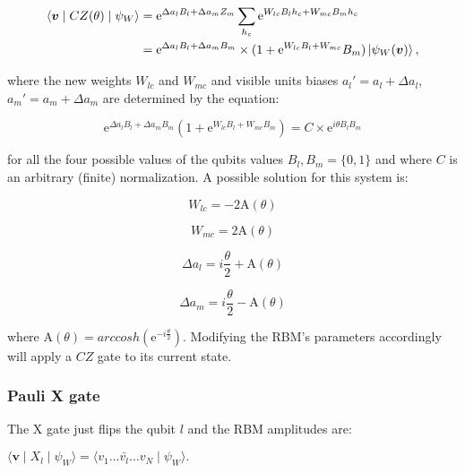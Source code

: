 \begin{align}
    \langle \bm{v} \mid CZ(\theta) \mid \psi_{W}  \rangle &= 
    \mathrm{e}^{\Delta a_{l} B_{l} + \Delta a_{m} Z_{m}} \sum_{h_{c}}\mathrm{e}^{W_{lc} B_{l} h_{c} + W_{mc} B_{m} h_{c}} \\
    &= \mathrm{e}^{\Delta a_{l} B_{l} + \Delta a_{m} B_{m}} \times (1 + \mathrm{e}^{W_{lc} B_{l} + W_{mc}} B_{m}) \Ket{\psi_{W}(\bm{v})},
\end{align}

where the new weights $W_{lc}$ and $W_{mc}$ and visible units biases $a_{l}\prime= a_{l} + \Delta a_{l}$,
$a_{m}\prime= a_{m} + \Delta a_{m}$ are determined by the equation:

\begin{equation}
   \mathrm{e}^{\Delta a_{l} B_{l} + \Delta a_{m} B_{m}}(1 + \mathrm{e}^{W_{lc} B_{l} + W_{mc} B_{m}}) = C \times \mathrm{e}^{i \theta B_{l} B_{m}}
\end{equation}

for all the four possible values of the qubits values $B_{l}, B_{m} = \{0,1\}$ and where $C$ is an arbitrary (finite)
normalization. A possible solution for this system is:

\begin{equation}
   W_{lc} = -2\mathrm{A}(\theta) 
\end{equation}

\begin{equation}
   W_{mc} = 2\mathrm{A}(\theta) 
\end{equation}

\begin{equation}
   \Delta a_{l} = i \frac{\theta}{2} + \mathrm{A}(\theta)
\end{equation}

\begin{equation}
   \Delta a_{m} = i \frac{\theta}{2} - \mathrm{A}(\theta)
\end{equation}

where $\mathrm{A}(\theta) = arccosh(\mathrm{e}^{-i \frac{\theta}{2}})$. Modifying the RBM's parameters 
accordingly will apply a $CZ$ gate to its current state.

\subsubsection{Pauli X gate}
The X gate just flips the qubit $l$ and the RBM amplitudes are:

$
    \langle \bm{v} \mid X_{l} \mid \psi_{W}  \rangle = 
    \langle v_{1} \dots \bar{v_{l}} \dots v_{N} \mid \psi_{W} \rangle.
$

